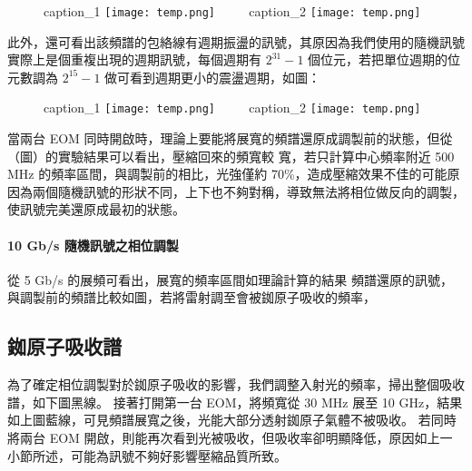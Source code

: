 \documentclass[class=NCU_thesis, crop=false]{standalone}
\begin{document}
\begin{figure}[!hbt]
    \centering
    \subcaptionbox
        {caption\_1
        \label{fig:subfig_fig1}}
        {\texttt{[image: temp.png]}}
    ~~~~
    \subcaptionbox
        {caption\_2
        \label{fig:subfig_fig2}}
        {\texttt{[image: temp.png]}}
\end{figure}


此外，還可看出該頻譜的包絡線有週期振盪的訊號，其原因為我們使用的隨機訊號實際上是個重複出現的週期訊號，每個週期有 $2^{31}-1$ 個位元，若把單位週期的位元數調為 $2^{15}-1$ 做可看到週期更小的震盪週期，如圖：

\begin{figure}[!hbt]
    \centering
    \subcaptionbox
        {caption\_1
        \label{fig:subfig_fig1}}
        {\texttt{[image: temp.png]}}
    ~~~~
    \subcaptionbox
        {caption\_2
        \label{fig:subfig_fig2}}
        {\texttt{[image: temp.png]}}
\end{figure}

當兩台 EOM 同時開啟時，理論上要能將展寬的頻譜還原成調製前的狀態，但從（圖）的實驗結果可以看出，壓縮回來的頻寬較
寬，若只計算中心頻率附近 500 MHz 的頻率區間，與調製前的相比，光強僅約 70\%，造成壓縮效果不佳的可能原因為兩個隨機訊號的形狀不同，上下也不夠對稱，導致無法將相位做反向的調製，使訊號完美還原成最初的狀態。

\paragraph{10 Gb/s 隨機訊號之相位調製}

從 5 Gb/s 的展頻可看出，展寬的頻率區間如理論計算的結果
頻譜還原的訊號，與調製前的頻譜比較如圖，若將雷射調至會被銣原子吸收的頻率，


\subsection{銣原子吸收譜}
為了確定相位調製對於銣原子吸收的影響，我們調整入射光的頻率，掃出整個吸收譜，如下圖黑線。
接著打開第一台 EOM，將頻寬從 30 MHz 展至 10 GHz，結果如上圖藍線，可見頻譜展寬之後，光能大部分透射銣原子氣體不被吸收。
若同時將兩台 EOM 開啟，則能再次看到光被吸收，但吸收率卻明顯降低，原因如上一小節所述，可能為訊號不夠好影響壓縮品質所致。
\end{document}
